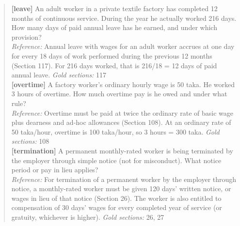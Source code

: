 \documentclass[11pt,a4paper]{article}
\begin{document}
\begin{quote}\small
\textbf{[leave]} An adult worker in a private textile factory has completed 12 months of continuous service. During the year he actually worked 216 days. How many days of paid annual leave has he earned, and under which provision?\\[2pt]
\textit{Reference:} Annual leave with wages for an adult worker accrues at one day for every 18 days of work performed during the previous 12 months (Section 117). For 216 days worked, that is 216/18 = 12 days of paid annual leave. \quad \textit{Gold sections:} 117\\[6pt]
\textbf{[overtime]} A factory worker's ordinary hourly wage is 50 taka. He worked 3 hours of overtime. How much overtime pay is he owed and under what rule?\\[2pt]
\textit{Reference:} Overtime must be paid at twice the ordinary rate of basic wage plus dearness and ad-hoc allowances (Section 108). At an ordinary rate of 50 taka/hour, overtime is 100 taka/hour, so 3 hours = 300 taka. \quad \textit{Gold sections:} 108\\[6pt]
\textbf{[termination]} A permanent monthly-rated worker is being terminated by the employer through simple notice (not for misconduct). What notice period or pay in lieu applies?\\[2pt]
\textit{Reference:} For termination of a permanent worker by the employer through notice, a monthly-rated worker must be given 120 days' written notice, or wages in lieu of that notice (Section 26). The worker is also entitled to compensation of 30 days' wages for every completed year of service (or gratuity, whichever is higher). \quad \textit{Gold sections:} 26, 27\\[6pt]
\end{quote}
\end{document}
